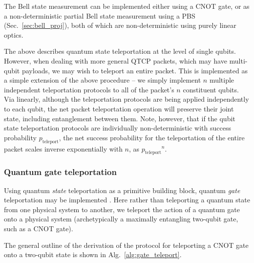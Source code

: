 The Bell state measurement can be implemented either using a CNOT gate, or as a non-deterministic partial Bell state measurement using a PBS (Sec.~\ref{sec:bell_proj}), both of which are non-deterministic using purely linear optics.

The above describes quantum state teleportation at the level of single qubits. However, when dealing with more general QTCP packets, which may have multi-qubit payloads, we may wish to teleport an entire packet. This is implemented as a simple extension of the above procedure -- we simply implement $n$ multiple independent teleportation protocols to all of the packet's $n$ constituent qubits. Via linearly, although the teleportation protocols are being applied independently to each qubit, the net packet teleportation operation will preserve their joint state, including entanglement between them. Note, however, that if the qubit state teleportation protocols are individually non-deterministic with success probability $p_\text{teleport}$, the net success probability for the teleportation of the entire packet scales inverse exponentially with $n$, as ${p_\text{teleport}}^n$.

%
%

\subsubsection{Quantum gate teleportation} \label{sec:teleport_gate} 

Using quantum \textit{state} teleportation as a primitive building block, quantum \textit{gate} teleportation may be implemented \cite{bib:GottesmanChuang99}. Here rather than teleporting a quantum state from one physical system to another, we teleport the action of a quantum gate onto a physical system (archetypically a maximally entangling two-qubit gate, such as a CNOT gate).

The general outline of the derivation of the protocol for teleporting a CNOT gate onto a two-qubit state is shown in Alg.~\ref{alg:gate_teleport}.

